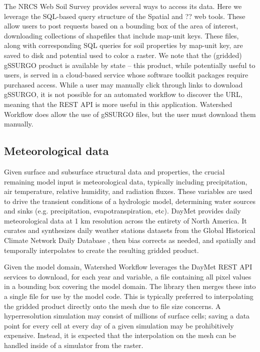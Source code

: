 \documentclass[a4paper,fleqn]{cas-dc}
\begin{document}
The NRCS Web Soil Survey provides several ways to access its data.
Here we leverage the SQL-based query structure of the Spatial and ?? web tools\cite{}.
These allow users to post requests based on a bounding box of the area of interest, downloading collections of shapefiles that include map-unit keys.
These files, along with corresponding SQL queries for soil properties by map-unit key, are saved to disk and potential used to color a raster.
We note that the (gridded) gSSURGO product is available by state -- this product, while potentially useful to users, is served in a cloud-based service whose software toolkit packages require purchased access.
While a user may manually click through links to download gSSURGO, it is not possible for an automated workflow to discover the URL, meaning that the REST API is more useful in this application.
Watershed Workflow does allow the use of gSSURGO files, but the user must download them manually.

\subsection{Meteorological data}\label{ssc:acquisition:met}
%
Given surface and subsurface structural data and properties, the crucial remaining model input is meteorological data, typically including precipitation, air temperature, relative humidity, and radiation fluxes.
These variables are used to drive the transient conditions of a hydrologic model, determining water sources and sinks (e.g. precipitation, evapotranspiration, etc).
DayMet\cite{} provides daily meteorological data at 1 km resolution across the entirety of North America.
It curates and synthesizes daily weather stations datasets from the Global Historical Climate Network Daily Database \cite{}, then bias corrects as needed, and spatially and temporally interpolates to create the resulting gridded product.

Given the model domain, Watershed Workflow leverages the DayMet REST API services to download, for each year and variable, a file containing all pixel values in a bounding box covering the model domain.
The library then merges these into a single file for use by the model code.
This is typically preferred to interpolating the gridded product directly onto the mesh due to file size concerns.
A hyperresolution simulation may consist of millions of surface cells; saving a data point for every cell at every day of a given simulation may be prohibitively expensive.
Instead, it is expected that the interpolation on the mesh can be handled inside of a simulator from the raster.
\end{document}
